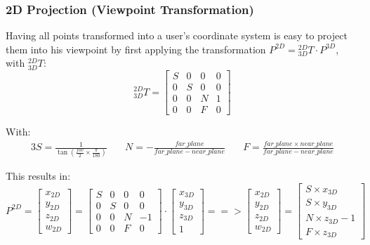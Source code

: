 \documentclass[a4paper,11pt,times,doublespace]{article}
\begin{document}
\subsubsection{2D Projection (Viewpoint Transformation)}

Having all points transformed into a user's coordinate system is easy to project them into his viewpoint by first applying the transformation $P^{2D} = {}^{2D}_{3D}T \cdot P^{3D}$, with ${}^{2D}_{3D}T$:
	\begin{equation*}
			{}^{2D}_{3D}T = \begin{bmatrix}
				S & 0 & 0 & 0\\	
				0 & S & 0 & 0\\
				0 & 0 & N & 1\\
				0 & 0 & F & 0
			\end{bmatrix}
	\end{equation*}

With:
	\begin{alignat*}{3}
		S = \frac{1}{\tan(\frac{fov}{2}\times\frac{\pi}{180})} &\quad
		N = -\frac{far\_plane}{far\_plane - near\_plane} &\quad
		F = \frac{far\_plane \times near\_plane}{far\_plane - near\_plane}
	\end{alignat*}

This results in:
	\begin{equation*}
		P^{2D} = 
		\begin{bmatrix} x_{2D} \\ y_{2D} \\ z_{2D} \\ w_{2D} \end{bmatrix} = 
		\begin{bmatrix}
			S & 0 & 0 & 0\\	
			0 & S & 0 & 0\\
			0 & 0 & N & -1\\
			0 & 0 & F & 0
		\end{bmatrix} \cdot
		\begin{bmatrix} x_{3D} \\ y_{3D} \\ z_{3D} \\ 1 \end{bmatrix} ==>
		\begin{bmatrix} x_{2D} \\ y_{2D} \\ z_{2D} \\ w_{2D} \end{bmatrix} = 
		\begin{bmatrix}
			S \times x_{3D}\\
			S \times y_{3D}\\
			N \times z_{3D} - 1\\
			F \times z_{3D}
		\end{bmatrix}
	\end{equation*}
\end{document}
